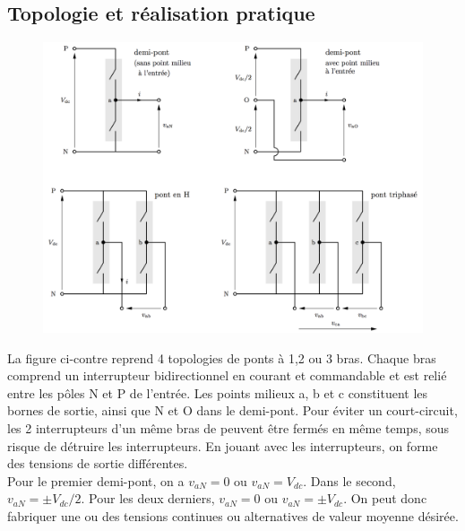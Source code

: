 	\subsection{Topologie et réalisation pratique}	
		\begin{figure}
		\vspace{-5mm}
		\includegraphics[scale=0.2]{ch4/7}
		\end{figure}
		La figure ci-contre reprend 4 topologies de ponts à 1,2 ou 3 bras. Chaque bras comprend un interrupteur bidirectionnel en courant et commandable et est relié entre les pôles N et P de l'entrée. Les points milieux a, b et c constituent les bornes de sortie, ainsi que N et O dans le demi-pont. Pour éviter un court-circuit, les 2 interrupteurs d'un même bras de peuvent être fermés en même temps, sous risque de détruire les interrupteurs. En jouant avec les interrupteurs, on forme des tensions de sortie différentes. \\
		
		Pour le premier demi-pont, on a $v_{aN} = 0$ ou $v_{aN} = V_{dc}$. Dans le second, $v_{aN} = \pm V_{dc}/2$. Pour les deux derniers, $v_{aN} = 0$ ou $v_{aN} = \pm V_{dc}$. On peut donc fabriquer une ou des tensions continues ou alternatives de valeur moyenne désirée.  
		
